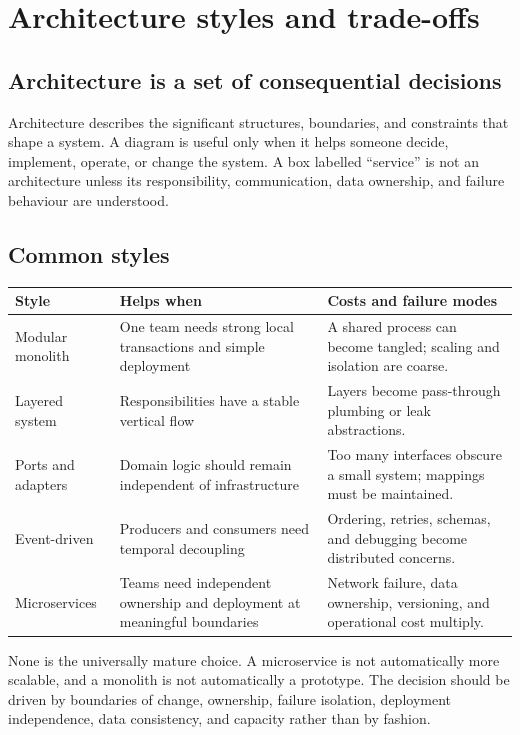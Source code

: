 \chapter{Architecture styles and trade-offs}

\section{Architecture is a set of consequential decisions}
Architecture describes the significant structures, boundaries, and constraints
that shape a system. A diagram is useful only when it helps someone decide,
implement, operate, or change the system. A box labelled “service” is not an
architecture unless its responsibility, communication, data ownership, and
failure behaviour are understood.

\section{Common styles}
\noindent\begin{tabularx}{\textwidth}{@{}p{}p{}X@{}}
\toprule
Style & Helps when & Costs and failure modes \\
\midrule
Modular monolith & One team needs strong local transactions and simple deployment & A shared process can become tangled; scaling and isolation are coarse. \\
Layered system & Responsibilities have a stable vertical flow & Layers become pass-through plumbing or leak abstractions. \\
Ports and adapters & Domain logic should remain independent of infrastructure & Too many interfaces obscure a small system; mappings must be maintained. \\
Event-driven & Producers and consumers need temporal decoupling & Ordering, retries, schemas, and debugging become distributed concerns. \\
Microservices & Teams need independent ownership and deployment at meaningful boundaries & Network failure, data ownership, versioning, and operational cost multiply. \\
\bottomrule
\end{tabularx}

None is the universally mature choice. A microservice is not automatically more
scalable, and a monolith is not automatically a prototype. The decision should
be driven by boundaries of change, ownership, failure isolation, deployment
independence, data consistency, and capacity rather than by fashion.

